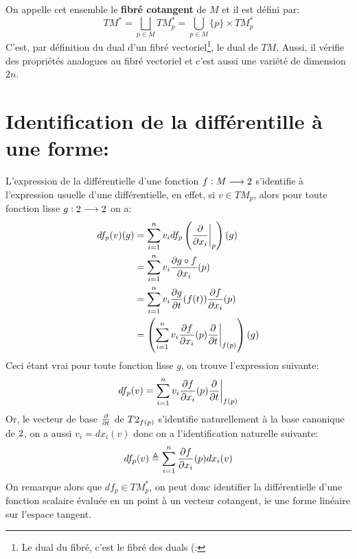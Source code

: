 On appelle cet ensemble le \textbf{fibré cotangent} de \( M \) et il est défini par:
\[ 
   TM^* = \bigsqcup_{p \in M} TM^*_p = \bigcup_{p \in M} \{p\} \times TM^*_p
\]
C'est, par définition du dual d'un fibré vectoriel\footnote[1]{Le dual du fibré, c'est le fibré des duals (:}, le dual de \( TM \). Aussi, il vérifie des propriétés analogues au fibré vectoriel et c'est aussi une variété de dimension \( 2n \).
\section{Identification de la différentille à une forme:}
L'expression de la différentielle d'une fonction \( f : M \longrightarrow 2 \) s'identifie à l'expression usuelle d'une différentielle, en effet, si \( v \in TM_p \), alors pour toute fonction lisse \( g : 2 \longrightarrow 2 \) on a:
\begin{align*}
   df_p(v)(g) &= \sum_{i=1}^n v_i df_p\left(\frac{\partial }{\partial x_i}\biggr|_p\right)(g)\\
   &= \sum_{i=1}^n v_i \frac{\partial g \circ f}{\partial x_i}(p)\\
   &= \sum_{i=1}^n v_i \frac{\partial g}{\partial t}(f(t))\frac{\partial f}{\partial x_i}(p)\\
   &= \left(\sum_{i=1}^n v_i \frac{\partial f}{\partial x_i}(p)\frac{\partial }{\partial t}\biggr|_{f(p)}\right)(g)
\end{align*}
Ceci étant vrai pour toute fonction lisse \( g \), on trouve l'expression suivante:
\[ 
   df_p(v) = \sum_{i=1}^n v_i \frac{\partial f}{\partial x_i}(p)\frac{\partial }{\partial t}\biggr|_{f(p)}
\]
Or, le vecteur de base \(\frac{\partial }{\partial t}\) de \( T2_{f(p)} \) s'identifie naturellement à la base canonique de \( 2 \), on a aussi \( v_i = dx_i(v) \) donc on a l'identification naturelle suivante:
\[ 
   df_p(v) \triangleq \sum_{i=1}^n \frac{\partial f}{\partial x_i}(p)dx_i(v)
\]
On remarque alors que \( df_p \in TM^*_p \), on peut donc identifier la différentielle d'une fonction scalaire évaluée en un point à un vecteur cotangent, ie une forme linéaire sur l'espace tangent.
